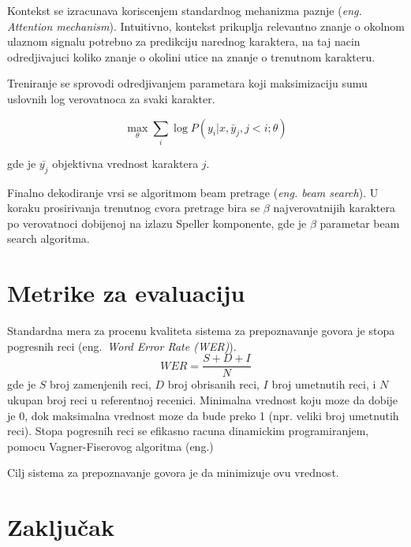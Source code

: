 \documentclass[a4paper]{article}
\begin{document}
\bigskip

Kontekst se izracunava koriscenjem standardnog mehanizma paznje (\textit{eng. Attention mechanism}).  Intuitivno, kontekst prikuplja relevantno znanje o okolnom ulaznom signalu potrebno za predikciju narednog karaktera,  na taj nacin odredjivajuci koliko znanje o okolini utice na znanje o trenutnom karakteru.

Treniranje se sprovodi odredjivanjem parametara koji maksimizaciju sumu uslovnih log verovatnoca za svaki karakter.

 \begin{equation}
\label{eq:max}
\max_{\theta} \sum_i \log P(y_i | x,  \bar{y}_j,  j < i; \theta)
\end{equation}

gde je $\bar{y_j}$ objektivna vrednost karaktera $j$.

Finalno dekodiranje vrsi se algoritmom beam pretrage (\textit{eng.  beam search}).  U koraku prosirivanja trenutnog cvora pretrage bira se $\beta$ najverovatnijih karaktera po verovatnoci dobijenoj na izlazu Speller komponente,  gde je $\beta$ parametar beam search algoritma.

\section{Metrike za evaluaciju}
Standardna mera za procenu kvaliteta sistema za prepoznavanje govora je stopa pogresnih reci (eng.~{\em Word Error Rate (WER)}).
\begin{equation*}
  WER = \frac{S + D + I}{N}
\end{equation*}
gde je $S$ broj zamenjenih reci, $D$ broj obrisanih reci, $I$ broj umetnutih reci, i $N$ ukupan broj reci u referentnoj recenici.
Minimalna vrednost koju moze da dobije je 0, dok maksimalna vrednost moze da bude preko 1 (npr. veliki broj umetnutih reci).
Stopa pogresnih reci se efikasno racuna dinamickim programiranjem, pomocu Vagner-Fiserovog algoritma (eng.)

Cilj sistema za prepoznavanje govora je da minimizuje ovu vrednost.

\section{Zaključak}
\label{sec:zakljucak}
\end{document}
